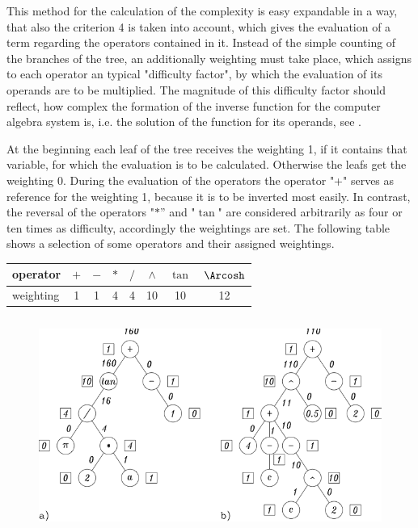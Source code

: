  This method for the calculation of the complexity is easy expandable in a way, that also the criterion 4 is taken into account, which gives the evaluation of a term regarding the operators contained in it. 
 Instead of the simple counting of the branches of the tree, an additionally weighting must take place, which assigns to each operator an typical "difficulty factor", by which the evaluation of its operands are to be multiplied. The magnitude of this difficulty factor should reflect, how complex the formation of the inverse function for the computer algebra system is, i.e. the solution of the function for its operands, see \cite{Trispel}.

At the beginning each leaf of the tree receives the weighting 1, if it contains that variable, for which the evaluation is to be calculated. Otherwise the leafs get the weighting 0. During the evaluation of the operators the operator  "+" serves as reference for the weighting 1, because it is to be inverted most easily. In contrast, the reversal of the operators  "$*$''  and "$\tan$" are considered arbitrarily as four or ten times as difficulty, accordingly the weightings are set. The following table shows a selection of some operators and their assigned weightings.
\begin{center}
\begin{tabular}{|l|*{7}{c|}}
\hline
operator   & $+$ & $-$ & $*$ & $/$ & $\wedge$ & $\tan$ & $\Arcosh$ \\
\hline
weighting &  1  &  1  &  4  &  4  &    10    &   10   &     12    \\
\hline
\end{tabular}
\end{center}

\begin {figure} [htbp]
\begin {center}
\includegraphics[height=7cm]{BEWERTG.png}
\caption {}%
\end {center}
\end {figure}

